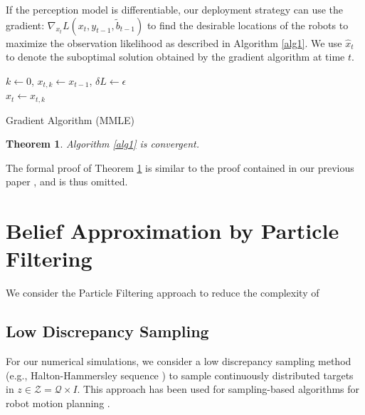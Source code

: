 \documentclass[letterpaper, 10 pt, conference]{ieeeconf}
\newtheorem{theorem}{Theorem}[section]
\newcommand{\Ram}[1]{{\normalsize{\textbf{({\color{green}Ram:\ }#1)}}}}
\newcommand{\HJ}[1]{{\color{black}{#1}}}
\begin{document}
If the perception model is differentiable, our deployment strategy can use the gradient: 
$
\nabla_{x_t} L(x_t,y_{t-1},\widetilde{b}_{t-1})
$
to find the desirable locations of the robots to maximize the observation likelihood as described in Algorithm \ref{alg1}.  
We use $\hat{x}_t$ to denote the suboptimal solution obtained by the gradient algorithm at time $t$.

{\tiny{
		\begin{algorithm}
			\DontPrintSemicolon
			$k \gets 0$, $x_{t,k} \gets x_{t-1}$, $\delta{L} \gets \epsilon$\\
\Return $\hat{x}_t \gets x_{t,k}$
			\caption{Gradient Algorithm (MMLE)}\label{alg1}
		\end{algorithm}
}}


\begin{theorem}
	Algorithm \ref{alg1} is convergent.
	\label{thm1}
\end{theorem}
The formal proof of Theorem \ref{thm1} is similar to the proof
contained in our previous paper \cite{park2014robust}, and is thus omitted.

\section{Belief Approximation by Particle Filtering}
\label{sec:sec6}
We consider the Particle Filtering approach to reduce the complexity of \HJ{the map reconstruction process.} 

\subsection{Low Discrepancy Sampling} 
For our numerical simulations, we consider a low discrepancy sampling method (e.g., Halton-Hammersley sequence \cite{beardwood1959shortest}) to sample continuously distributed targets in $z \in \mathcal{Z} = \mathcal{Q} \times {I}$. 
This approach has been used for sampling-based algorithms for robot motion planning \cite{lavalle2006planning}.
\end{document}
